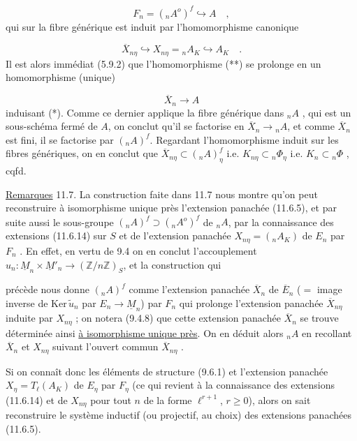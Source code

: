 \begin{equation}\tag{*}
F_n = ({}_nA^o)^f \hookrightarrow A \quad ,
\end{equation}
qui sur la fibre générique est induit par l'homomorphisme canonique

\begin{equation}\tag{**}
\overline{X}_{n\eta} \hookrightarrow X_{n\eta} = {}_nA_K \hookrightarrow A_K \quad .
\end{equation}
Il est alors immédiat (5.9.2) que l'homomorphisme (**) se prolonge en un homomorphisme (unique)

\begin{equation}\tag{***}
\overline{X}_n \longrightarrow A
\end{equation}
induisant (*). Comme ce dernier applique la fibre générique dans ${}_nA$ , qui est un sous-schéma fermé de $A$, on conclut qu'il se factorise en $\overline{X}_n \longrightarrow {}_nA$, et comme $\overline{X}_n$ est fini, il se factorise par $({}_nA)^f$. Regardant l'homomorphisme induit sur les fibres génériques, on en conclut que $\overline{X}_{n\eta} \subset ({}_nA)^f_\eta$ i.e. $K_{n\eta} \subset {}_n\Phi_\eta$ i.e. $K_n \subset {}_n\Phi$ , cqfd.

\underline{Remarques} 11.7. La construction faite dans 11.7 nous montre qu'on peut reconstruire à isomorphisme unique près l'extension panachée (11.6.5), et par suite aussi le sous-groupe $({}_nA)^f \supset ({}_nA^o)^f$ de ${}_nA$, par la connaissance des extensions (11.6.14) sur $S$ et de l'extension panachée $X_{n\eta} = ({}_nA_K)$ de $E_n$ par $F_n$ . En effet, en vertu de 9.4 on en conclut l'accouplement $u_n : \underline{M}_n \times \underline{M}'_n \longrightarrow (\mathbb{Z}/n\mathbb{Z})_S$, et la construction qui



précède nous donne $({}_nA)^f$ comme l'extension panachée $\overline{X}_n$ de $\overline{E}_n$ ($=$ image inverse de $\mathrm{Ker}\,\widetilde{u}_n$ par $E_n \longrightarrow \underline{M}_n$) par $F_n$ qui prolonge l'extension panachée $\overline{X}_{n\eta}$ induite par $X_{n\eta}$ ; on notera (9.4.8) que cette extension panachée $\overline{X}_n$ se trouve déterminée ainsi \underline{à isomorphisme unique près}. On en déduit alors ${}_nA$ en recollant $\overline{X}_n$ et $X_{n\eta}$ suivant l'ouvert commun $\overline{X}_{n\eta}$ .

Si on connaît donc les éléments de structure (9.6.1) et l'extension panachée $X_\eta = T_\ell(A_K)$ de $E_\eta$ par $F_\eta$ (ce qui revient à la connaissance des extensions (11.6.14) et de $X_{n\eta}$ pour tout $n$ de la forme $\ell^{r+1}$, $r \geq 0$), alors on sait reconstruire le système inductif (ou projectif, au choix) des extensions panachées (11.6.5).

